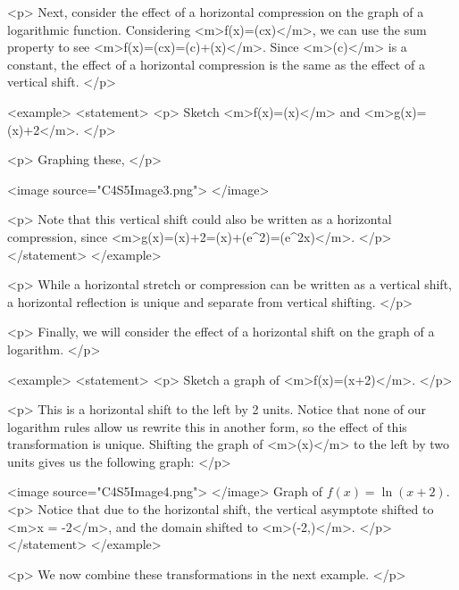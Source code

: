         <p>
            Next, consider the effect of a horizontal compression on the graph of a logarithmic function.
            Considering <m>f(x)=\log(cx)</m>, we can use the sum property to see <m>f(x)=\log(cx)=\log(c)+\log(x)</m>.
            Since <m>\log(c)</m> is a constant, the effect of a horizontal compression is the same as the effect of a vertical shift.
        </p>

        <example>
            <statement>
                <p>
                    Sketch <m>f(x)=\ln(x)</m> and <m>g(x)=\ln(x)+2</m>.
                </p>

                <p>
                    Graphing these,
                </p>

                <image source="C4S5Image3.png">
                </image>

                <p>
                    Note that this vertical shift could also be written as a horizontal compression, since <m>g(x)=\ln(x)+2=\ln(x)+\ln(e^{2})=\ln(e^{2}x)</m>.
                </p>
            </statement>
        </example>

        <p>
            While a horizontal stretch or compression can be written as a vertical shift, a horizontal reflection is unique and separate from vertical shifting.
        </p>

        <p>
            Finally, we will consider the effect of a horizontal shift on the graph of a logarithm.
        </p>

        <example>
            <statement>
                <p>
                    Sketch a graph of <m>f(x)=\ln(x+2)</m>.
                </p>

                <p>
                    This is a horizontal shift to the left by 2 units.
                    Notice that none of our logarithm rules allow us rewrite this in another form, so the effect of this transformation is unique.
                    Shifting the graph of <m>\ln(x)</m> to the left by two units gives us the following graph:
                </p>

                <image source="C4S5Image4.png">
                </image>
                Graph of $f(x)=\ln(x+2)$.
                <p>
                    Notice that due to the horizontal shift, the vertical asymptote shifted to <m>x = -2</m>, and the domain shifted to <m>(-2,\infty)</m>.
                </p>
            </statement>
        </example>

        <p>
            We now combine these transformations in the next example.
        </p>

